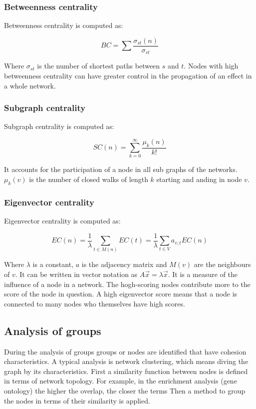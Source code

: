 		\subsubsection{Betweenness centrality}
		Betweenness centrality is computed as:

		$$BC = \sum\frac{\sigma_{st}(n)}{\sigma_{st}}$$

		Where $\sigma_{st}$ is the number of shortest paths between $s$ and $t$.
		Nodes with high betweenness centrality can have greater control in the propagation of an effect in a whole network.

		\subsubsection{Subgraph centrality}
		Subgraph centrality is computed as:

		$$SC(n) = \sum\limits_{k=0}^\infty \frac{\mu_k(n)}{k!}$$

		It accounts for the participation of a node in all sub graphs of the networks.
		$\mu_k(v)$ is the number of closed walks of length $k$ starting and anding in node $v$.

		\subsubsection{Eigenvector centrality}
		Eigenvector centrality is computed as:

		$$EC(n) = \frac{1}{\lambda}\sum\limits_{t\in M(n)} EC(t) = \frac{1}{\lambda}\sum\limits_{t\in V} a_{v,t}EC(n)$$

		Where $\lambda$ is a constant, $a$ is the adjacency matrix and $M(v)$ are the neighbours of $v$.
		It can be written in vector notation as $A\vec{x} = \lambda\vec{x}$.
		It is a measure of the influence of a node in a network.
		The hogh-scoring nodes contribute more to the score of the node in question.
		A high eigenvector score means that a node is connected to many nodes who themselves have high scores.

	\subsection{Analysis of groups}
	During the analysis of groups groups or nodes are identified that have cohesion characteristics.
	A typical analysis is network clustering, which means diving the graph by its characteristics.
	First a similarity function between nodes is defined in terms of network topology. 
	For example, in the enrichment analysis (gene ontology) the higher the overlap, the closer the terms
	Then a method to group the nodes in terms of their similarity is applied.

